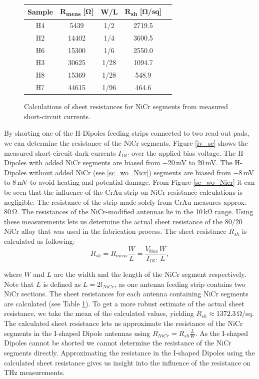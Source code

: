 \begin{figure} 
    \centering
    \captionsetup{width=0.45\textwidth}
    \begin{tabular}{|c|c|c|c|c|}
        \hline
        Sample & R\textsubscript{meas} [\si{\ohm}] & W/L & R\textsubscript{sh} [\si{\ohm}/sq]\\
        \hline
        H4 & 5439 & 1/2 & 2719.5 \\
        H2 & 14402 & 1/4 & 3600.5 \\
        H6 & 15300 & 1/6 & 2550.0 \\
        H3 & 30625 & 1/28 & 1094.7 \\
        H8 & 15369 & 1/28 & 548.9 \\
        H7 & 44615 & 1/96 & 464.6 \\
        \hline
    \end{tabular}
    \caption{Calculations of sheet resistances for NiCr segments from measured short-circuit currents.}
    \label{tab:sheetres}
\end{figure}
By shorting one of the H-Dipoles feeding strips connected to two read-out pads, we can determine the resistance of the NiCr segments. Figure \ref{iv_sc} shows the measured short-circuit dark currents $I_{DC}$ over the applied bias voltage. The H-Dipoles with added NiCr segments are biased from \num{-20}\,\si{\milli \volt} to \num{20}\,\si{\milli \volt}. The H-Dipoles without added NiCr (see \ref{sc_wo_Nicr}) segments are biased from \num{-8}\,\si{\milli \volt} to \num{8}\,\si{\milli \volt} to avoid heating and potential damage. From Figure \ref{sc_wo_Nicr} it can be seen that the influence of the CrAu strip on NiCr resistance calculations is negligible. The resistance of the strip made solely from CrAu measures approx. \num{80}\,\si{\ohm}. The resistances of the NiCr-modified antennas lie in the \num{10}\,\si{\kilo \ohm} range. Using these measurements lets us determine the actual sheet resistance of the \num{80}/\num{20} NiCr alloy that was used in the fabrication process. The sheet resistance $R_{sh}$ is calculated as following: 
\begin{equation}
    R_{sh} = R_{meas}\frac{W}{L} = \frac{V_{bias}}{I_{DC}}\frac{W}{L}, 
\end{equation}

where $W$ and $L$  are the width and the length of the NiCr segment respectively. Note that $L$ is defined as $L = 2l_{NiCr}$, as one antenna feeding strip contains two NiCr sections. The sheet resistances for each antenna containing NiCr segments are calculated (see Table \ref{tab:sheetres}). To get a more robust estimate of the actual sheet resistance, we take the mean of the calculated values, yielding $R_{sh} \approx 1372.3$\,\si{\ohm}/sq. The calculated sheet resistance lets us approximate the resistance of the NiCr segments in the I-shaped Dipole antennas using $R_{NiCr} = R_{sh}\frac{L}{W}$. As the I-shaped Dipoles cannot be shorted we cannot determine the resistance of the NiCr segments directly.  Approximating the resistance in the I-shaped Dipoles using the calculated sheet resistance gives us insight into the influence of the resistance on THz measurements. 

